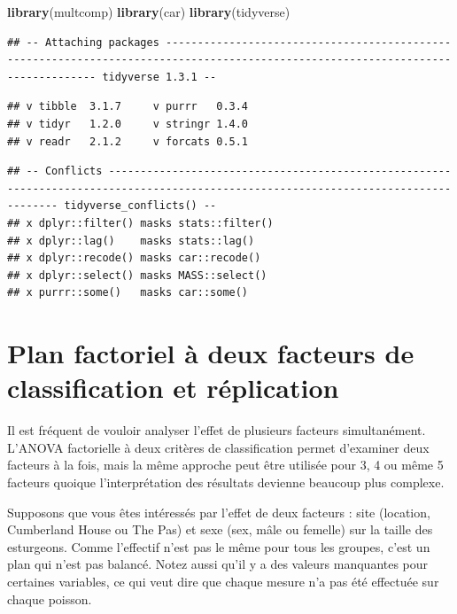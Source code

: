 \documentclass[
  12pt,
]{book}
\newenvironment{Shaded}{\begin{snugshade}}{\end{snugshade}}
\newcommand{\KeywordTok}[1]{\textcolor[rgb]{0.13,0.29,0.53}{\textbf{#1}}}
\newcommand{\NormalTok}[1]{#1}
\begin{document}
\begin{Shaded}
\begin{Highlighting}[]
\KeywordTok{library}\NormalTok{(multcomp)}
\KeywordTok{library}\NormalTok{(car)}
\KeywordTok{library}\NormalTok{(tidyverse)}
\end{Highlighting}
\end{Shaded}

\begin{verbatim}
## -- Attaching packages --------------------------------------------------------------------------------------------------------------------------------- tidyverse 1.3.1 --
\end{verbatim}

\begin{verbatim}
## v tibble  3.1.7     v purrr   0.3.4
## v tidyr   1.2.0     v stringr 1.4.0
## v readr   2.1.2     v forcats 0.5.1
\end{verbatim}

\begin{verbatim}
## -- Conflicts ------------------------------------------------------------------------------------------------------------------------------------ tidyverse_conflicts() --
## x dplyr::filter() masks stats::filter()
## x dplyr::lag()    masks stats::lag()
## x dplyr::recode() masks car::recode()
## x dplyr::select() masks MASS::select()
## x purrr::some()   masks car::some()
\end{verbatim}

\hypertarget{plan-factoriel-uxe0-deux-facteurs-de-classification-et-ruxe9plication}{%
\section{Plan factoriel à deux facteurs de classification et réplication}\label{plan-factoriel-uxe0-deux-facteurs-de-classification-et-ruxe9plication}}

Il est fréquent de vouloir analyser l'effet de plusieurs facteurs simultanément. L'ANOVA factorielle à deux critères de classification permet d'examiner deux facteurs à la fois, mais la même approche peut être utilisée pour 3, 4 ou même 5 facteurs quoique l'interprétation des résultats devienne beaucoup plus complexe.

Supposons que vous êtes intéressés par l'effet de deux facteurs : site (location, Cumberland House ou The Pas) et sexe (sex, mâle ou femelle) sur la taille des esturgeons. Comme l'effectif n'est pas le même pour tous les groupes, c'est un plan qui n'est pas balancé. Notez aussi qu'il y a des valeurs manquantes pour certaines variables, ce qui veut dire que chaque mesure n'a pas été effectuée sur chaque poisson.
\end{document}

